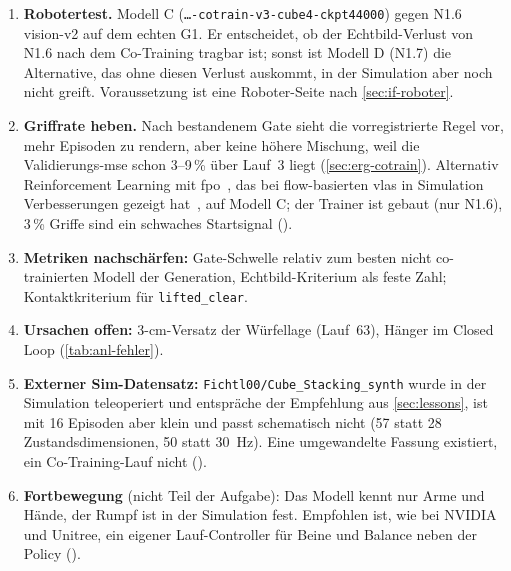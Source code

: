 \begin{enumerate}
  \item \textbf{Robotertest.} Modell C (\texttt{…-cotrain-v3-cube4-ckpt44000}) gegen N1.6
    vision-v2 auf dem echten G1. Er entscheidet, ob der Echtbild-Verlust von N1.6 nach dem
    Co-Training tragbar ist; sonst ist Modell D (N1.7) die Alternative, das ohne diesen Verlust
    auskommt, in der Simulation aber noch nicht greift. Voraussetzung ist eine Roboter-Seite
    nach \cref{sec:if-roboter}.
  \item \textbf{Griffrate heben.} Nach bestandenem Gate sieht die vorregistrierte Regel vor,
    mehr Episoden zu rendern, aber keine höhere Mischung, weil die Validierungs-\ac{mse} schon
    3--9\,\% über Lauf~3 liegt (\cref{sec:erg-cotrain}). Alternativ Reinforcement Learning mit
    \ac{fpo}~\cite{fpo2025}, das bei flow-basierten \acp{vla} in Simulation
    Verbesserungen gezeigt hat~\cite{pirl2025}, auf Modell C; der Trainer ist gebaut (nur
    N1.6), 3\,\% Griffe sind ein schwaches Startsignal
    ().
  \item \textbf{Metriken nachschärfen:} Gate-Schwelle relativ zum besten nicht co-trainierten
    Modell der Generation, Echtbild-Kriterium als feste Zahl; Kontaktkriterium für
    \texttt{lifted\_clear}.
  \item \textbf{Ursachen offen:} 3-cm-Versatz der Würfellage (Lauf~63), Hänger im Closed Loop
    (\cref{tab:anl-fehler}).
  \item \textbf{Externer Sim-Datensatz:} \texttt{Fichtl00/Cube\_Stacking\_synth} wurde in der
    Simulation teleoperiert und entspräche der Empfehlung aus \cref{sec:lessons}, ist mit 16
    Episoden aber klein und passt schematisch nicht (57 statt 28 Zustandsdimensionen, 50 statt
    30~Hz). Eine umgewandelte Fassung existiert, ein Co-Training-Lauf nicht
    ().
  \item \textbf{Fortbewegung} (nicht Teil der Aufgabe): Das Modell kennt nur Arme und Hände, der
    Rumpf ist in der Simulation fest. Empfohlen ist, wie bei NVIDIA und Unitree, ein eigener
    Lauf-Controller für Beine und Balance neben der Policy
    ().
\end{enumerate}
